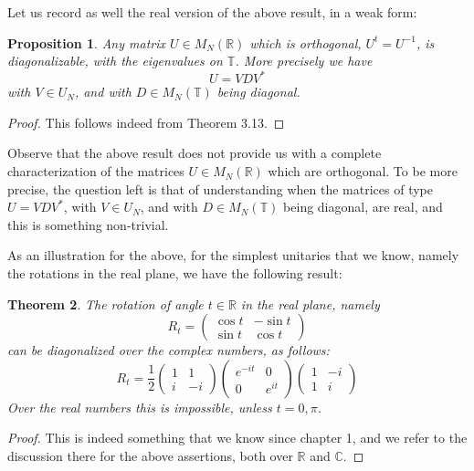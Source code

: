 \documentclass[12pt]{amsbook}
\newtheorem{theorem}{Theorem}[chapter]
\newtheorem{proposition}[theorem]{Proposition}
\begin{document}
Let us record as well the real version of the above result, in a weak form:


\begin{proposition}
Any matrix $U\in M_N(\mathbb R)$ which is orthogonal, $U^t=U^{-1}$,
is diagonalizable, with the eigenvalues on $\mathbb T$. More precisely we have
$$U=VDV^*$$
with $V\in U_N$, and with $D\in M_N(\mathbb T)$ being diagonal.
\end{proposition}

\begin{proof}
This follows indeed from Theorem 3.13.
\end{proof}

Observe that the above result does not provide us with a complete characterization of the matrices $U\in M_N(\mathbb R)$ which are orthogonal. To be more precise, the question left is that of understanding when the matrices of type $U=VDV^*$, with $V\in U_N$, and with $D\in M_N(\mathbb T)$ being diagonal, are real, and this is something non-trivial.

\bigskip

As an illustration for the above, for the simplest unitaries that we know, namely the rotations in the real plane, we have the following result:

\begin{theorem}
The rotation of angle $t\in\mathbb R$ in the real plane, namely
$$R_t=\begin{pmatrix}\cos t&-\sin t\\ \sin t&\cos t\end{pmatrix}$$
can be diagonalized over the complex numbers, as follows:
$$R_t=\frac{1}{2}\begin{pmatrix}1&1\\i&-i\end{pmatrix}
\begin{pmatrix}e^{-it}&0\\0&e^{it}\end{pmatrix}
\begin{pmatrix}1&-i\\1&i\end{pmatrix}$$
Over the real numbers this is impossible, unless $t=0,\pi$.
\end{theorem}

\begin{proof}
This is indeed something that we know since chapter 1, and we refer to the discussion there for the above assertions, both over $\mathbb R$ and $\mathbb C$.
\end{proof}
\end{document}
